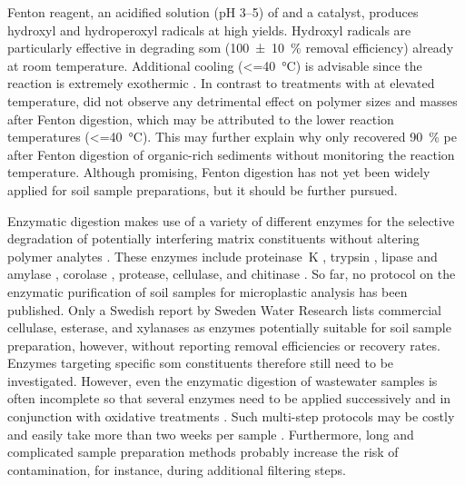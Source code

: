 Fenton reagent, an acidified solution (pH \numrange{3}{5}) of  and a  catalyst, produces hydroxyl and hydroperoxyl radicals at high yields.
Hydroxyl radicals are particularly effective in degrading \ac{som} (\SI{100(10)}{\percent} removal efficiency) already at room temperature. Additional cooling (\SI{<=40}{\degreeCelsius}) is advisable since the reaction is extremely exothermic \citep{HurleyValidation2018}.
In contrast to treatments with  at elevated temperature, \citet{HurleyValidation2018} did not observe any detrimental effect on polymer sizes and masses after Fenton digestion, which may be attributed to the lower reaction temperatures (\SI{<=40}{\degreeCelsius}). This may further explain why \citet{VermeirenMicroplastic2020} only recovered \SI{90}{\percent} \ac{pe} after Fenton digestion of organic-rich sediments without monitoring the reaction temperature. Although promising, Fenton digestion has not yet been widely applied for soil sample preparations, but it should be further pursued.

Enzymatic digestion makes use of a variety of different enzymes for the selective degradation of potentially interfering matrix constituents without altering polymer analytes \citep{LiuAnalytical2020}. These enzymes include proteinase~K \citep{ColeIsolation2014}, trypsin \citep{Courtene-JonesOptimisation2017},
lipase and amylase \citep{RailoApplication2018}, corolase \citep{LaversDetection2019},
protease, cellulase, and chitinase \citep{LoderEnzymatic2017}. So far, no protocol on the enzymatic purification of soil samples for microplastic analysis has been published. Only a Swedish report by Sweden Water Research \citep{LjungMicroplastics2018} lists commercial cellulase, esterase,
and xylanases as enzymes potentially suitable for soil sample preparation,
however, without reporting removal efficiencies or recovery rates.
Enzymes targeting specific \ac{som} constituents therefore still need to be investigated. However, even the enzymatic digestion of wastewater samples is often incomplete so that several enzymes need to be applied successively and in conjunction with oxidative treatments \citep{LoderEnzymatic2017,MintenigIdentification2017}. Such multi-step protocols may be costly and easily take more than two weeks per sample \citep{LoderEnzymatic2017}.
Furthermore, long and complicated sample preparation methods probably increase the risk of contamination, for instance, during additional filtering steps.

